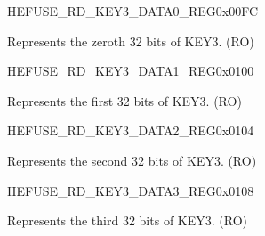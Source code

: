 \begin{register}{H}{EFUSE\_RD\_KEY3\_DATA0\_REG}{0x00FC}\label{regdesc:EFUSERDKEY3DATA0REG}
%
\regnewline%
\begin{regdesc}\begin{reglist}
\label{fielddesc:EFUSEKEY3DATA0}\item [EFUSE\_KEY3\_DATA0] Represents the zeroth 32 bits of KEY3. (RO)
\end{reglist}\end{regdesc}
\end{register}


\begin{register}{H}{EFUSE\_RD\_KEY3\_DATA1\_REG}{0x0100}\label{regdesc:EFUSERDKEY3DATA1REG}
%
\regnewline%
\begin{regdesc}\begin{reglist}
\label{fielddesc:EFUSEKEY3DATA1}\item [EFUSE\_KEY3\_DATA1] Represents the first 32 bits of KEY3. (RO)
\end{reglist}\end{regdesc}
\end{register}


\begin{register}{H}{EFUSE\_RD\_KEY3\_DATA2\_REG}{0x0104}\label{regdesc:EFUSERDKEY3DATA2REG}
%
\regnewline%
\begin{regdesc}\begin{reglist}
\label{fielddesc:EFUSEKEY3DATA2}\item [EFUSE\_KEY3\_DATA2] Represents the second 32 bits of KEY3. (RO)
\end{reglist}\end{regdesc}
\end{register}


\begin{register}{H}{EFUSE\_RD\_KEY3\_DATA3\_REG}{0x0108}\label{regdesc:EFUSERDKEY3DATA3REG}
%
\regnewline%
\begin{regdesc}\begin{reglist}
\label{fielddesc:EFUSEKEY3DATA3}\item [EFUSE\_KEY3\_DATA3] Represents the third 32 bits of KEY3. (RO)
\end{reglist}\end{regdesc}
\end{register}


